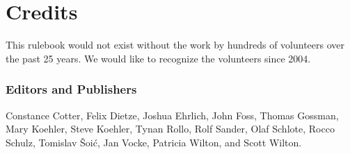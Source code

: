 \renewcommand\thepart{} %
\renewcommand\partname{} %
\part{Credits}
This rulebook would not exist without the work by hundreds of volunteers over the past 25 years.
We would like to recognize the volunteers since 2004.

\vspace{-2pt}
\section*{Editors and Publishers}
\vspace{-2pt}
\begingroup
\fontsize{10pt}{10pt}\selectfont
Constance Cotter,
Felix Dietze,
Joshua Ehrlich,
John Foss,
Thomas Gossman,
Mary Koehler,
Steve Koehler,
Tynan Rollo,
Rolf Sander,
Olaf Schlote,
Rocco Schulz,
Tomislav Šoić,
Jan Vocke,
Patricia Wilton,
and Scott Wilton.
\endgroup

\vspace{-2pt}
